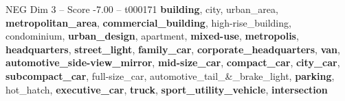\begin{textsample}{NEG Dim 3 – Score -7.00 – t000171}  \label{ex:f3_neg_011}
\textbf{building}, city, urban\_area, \textbf{metropolitan\_area}, \textbf{commercial\_building}, high-rise\_building, condominium, \textbf{urban\_design}, apartment, \textbf{mixed-use}, \textbf{metropolis}, \textbf{headquarters}, \textbf{street\_light}, \textbf{family\_car}, \textbf{corporate\_headquarters}, \textbf{van}, \textbf{automotive\_side-view\_mirror}, \textbf{mid-size\_car}, \textbf{compact\_car}, \textbf{city\_car}, \textbf{subcompact\_car}, full-size\_car, automotive\_tail\_\&\_brake\_light, \textbf{parking}, hot\_hatch, \textbf{executive\_car}, \textbf{truck}, \textbf{sport\_utility\_vehicle}, \textbf{intersection}

\end{textsample}
